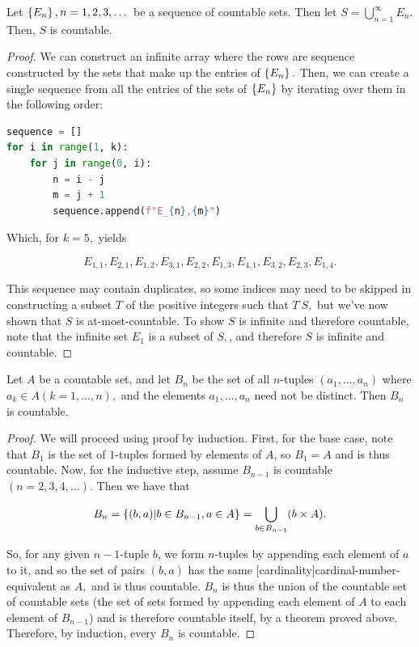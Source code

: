 \documentclass{article}
\begin{document}
\begin{theorem}\label{union-of-a-sequence-of-countable-sets-is-countable}
Let $\left\{ E_n \right\}, n = 1, 2, 3, \dots$ be a \@{sequence} of \@{countable} sets. Then let $S = \bigcup_{n=1}^\infty E_n.$ Then, $S$ is countable.
\end{theorem}

\begin{proof}
We can construct an infinite array where the rows are sequence constructed by the sets that make up the entries of $\left\{ E_n \right\}.$ Then, we can create a single \@{sequence} from all the entries of the sets of $\left\{ E_n \right\}$ by iterating over them in the following order:

\begin{lstlisting}[language=Python]
sequence = []
for i in range(1, k):
    for j in range(0, i):
        n = i - j
        m = j + 1
        sequence.append(f"E_{n},{m}")
\end{lstlisting}

Which, for $k = 5,$ yields

\[ E_{1,1}, E_{2,1}, E_{1,2}, E_{3,1}, E_{2,2}, E_{1,3}, E_{4,1}, E_{3,2}, E_{2,3}, E_{1,4}. \]

This sequence may contain duplicates, so some indices may need to be skipped in constructing a \@{subset} $T$ of the positive integers such that $T ~ S,$ but we've now shown that $S$ is \@{at-most-countable}. To show $S$ is \@{infinite} and therefore \@{countable}, note that the infinite set $E_1$ is a subset of $S,$, and therefore $S$ is infinite and countable.
\end{proof}


\begin{theorem}\label{n-tuples-of-countable-elements-are-countable}
Let $A$ be a \@{countable} set, and let $B_n$ be the set of all $n$-tuples $(a_1, \dots, a_n)$ where $a_k \in A (k = 1, \dots, n),$ and the \@{elements} $a_1, \dots, a_n$ need not be distinct. Then $B_n$ is countable.
\end{theorem}

\begin{proof}
We will proceed using proof by induction. First, for the base case, note that $B_1$ is the set of $1$-tuples formed by \@{elements} of $A$, so $B_1 = A$ and is thus \@{countable}. Now, for the inductive step, assume $B_{n-1}$ is countable $(n = 2, 3, 4, \dots).$ Then we have that

\[ B_n = \left\{ (b,a) | b \in B_{n-1}, a \in A \right\} = \bigcup_{b \in B_{n-1}} ({b} \times A). \]

So, for any given $n-1$-tuple $b$, we form $n$-tuples by appending each element of $a$ to it, and so the set of pairs $(b,a)$ has the same \@[cardinality]{cardinal-number-equivalent} as $A,$ and is thus countable. $B_n$ is thus the union of the countable set of countable sets (the set of sets formed by appending each element of $A$ to each element of $B_{n-1}$) and is therefore countable itself, by a theorem proved above. Therefore, by induction, every $B_n$ is countable.
\end{proof}
\end{document}
